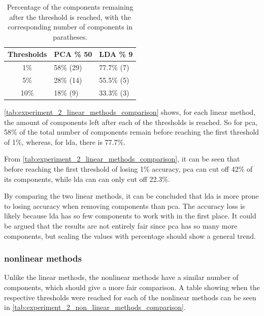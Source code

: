 \begin{table}[htb!]
    \centering
    \begin{tabular}{cp{}p{}}
        \toprule
        \textbf{Thresholds} & \textbf{PCA \% 50} & \textbf{LDA \% 9} \\
        \midrule
        1\% & 58\% (29) & 77.7\% (7) \\
        5\% & 28\% (14) & 55.5\% (5) \\
        10\% & 18\% (9) & 33.3\% (3) \\
        \bottomrule
    \end{tabular}
    \caption{Percentage of the components remaining after the threshold is reached, with the corresponding number of components in paratheses.}
    \label{tab:experiment_2_linear_methods_comparison}
\end{table}

\autoref{tab:experiment_2_linear_methods_comparison} shows, for each linear method, the amount of components left after each of the thresholds is reached. So for \gls{pca}, 58\% of the total number of components remain before reaching the first threshold of 1\%, whereas, for \gls{lda}, there is 77.7\%.

From \autoref{tab:experiment_2_linear_methods_comparison}, it can be seen that before reaching the first threshold of losing 1\% accuracy, \gls{pca} can cut off 42\% of its components, while \gls{lda} can can only cut off 22.3\%.

By comparing the two linear methods, it can be concluded that \gls{lda} is more prone to losing accuracy when removing components than \gls{pca}. The accuracy loss is likely because \gls{lda} has so few components to work with in the first place. It could be argued that the results are not entirely fair since \gls{pca} has so many more components, but scaling the values with percentage should show a general trend.


\subsubsection{nonlinear methods}
Unlike the linear methods, the nonlinear methods have a similar number of components, which should give a more fair comparison. A table showing when the respective thresholds were reached for each of the nonlinear methods can be seen in \autoref{tab:experiment_2_non_linear_methods_comparison}.

